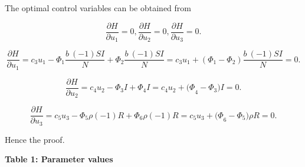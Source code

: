 \documentclass[10pt]{NSP1}
\begin{document}
The optimal control variables can be obtained from

\[
\frac{\partial H}{\partial u_{1}} = 0,\frac{\partial H}{\partial u_{2}} = 0,\frac{\partial H}{\partial u_{3}} = 0.
\]

\[
\frac{\partial H}{\partial u_{1}} = c_{3}u_{1} - \Phi_{1}\frac{b\ ( - 1)SI}{N} + \Phi_{2}\frac{b\ ( - 1)SI}{N} = c_{3}u_{1} + \left( \Phi_{1} - \Phi_{2} \right)\frac{b\ ( - 1)SI}{N} = 0.
\]

\[
\frac{\partial H}{\partial u_{2}} = c_{4}u_{2} - \Phi_{3}I + \Phi_{4}I = c_{4}u_{2} + {(\Phi}_{4} - \Phi_{3})I = 0.
\]

\[
\frac{\partial H}{\partial u_{3}} = c_{5}u_{3} - \Phi_{5}\rho( - 1)R + \Phi_{6}\rho( - 1)R = c_{5}u_{3} + {(\Phi}_{6} - \Phi_{5})\rho R = 0.
\]

Hence the proof.

\par\vspace{14.0pt}\noindent \begin{center}\large\bfseries Table 1: Parameter values\end{center}\vspace{14.0pt}
\end{document}
